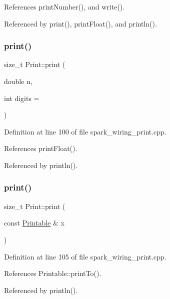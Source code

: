 References print\+Number(), and write().



Referenced by print(), print\+Float(), and println().

\mbox{\label{class_print_ae8b4c025786c820afe0a90aeea01c9c5}} 
\subsubsection{\texorpdfstring{print()}{print()}\hspace{0.1cm}{\footnotesize\ttfamily [8/19]}}
{\footnotesize\ttfamily size\+\_\+t Print\+::print (\begin{DoxyParamCaption}\item[{double}]{n,  }\item[{int}]{digits = {} }\end{DoxyParamCaption})}



Definition at line 100 of file spark\+\_\+wiring\+\_\+print.\+cpp.



References print\+Float().



Referenced by println().

\mbox{\label{class_print_a901b0f06ae34aab31b8fbb4298f0596e}} 
\subsubsection{\texorpdfstring{print()}{print()}\hspace{0.1cm}{\footnotesize\ttfamily [9/19]}}
{\footnotesize\ttfamily size\+\_\+t Print\+::print (\begin{DoxyParamCaption}\item[{const \hyperlink{class_printable}{Printable} \&}]{x }\end{DoxyParamCaption})}



Definition at line 105 of file spark\+\_\+wiring\+\_\+print.\+cpp.



References Printable\+::print\+To().



Referenced by println().

